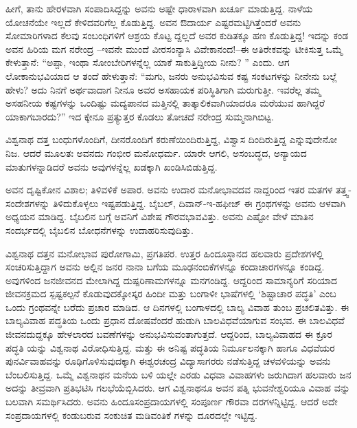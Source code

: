 ಹೀಗೆ, ತಾನು ಹೇರಳವಾಗಿ ಸಂಪಾದಿಸಿದ್ದನ್ನು ಅವನು ಅಷ್ಟೇ ಧಾರಾಳವಾಗಿ ಖರ್ಚೂ ಮಾಡುತ್ತಿದ್ದ. ನಾಳೆಯ ಯೋಚನೆಯೇ ಇಲ್ಲದೆ ಕೇಳಿದವರಿಗೆಲ್ಲ ಕೊಡುತ್ತಿದ್ದ. ಅವನ ಔದಾರ್ಯ ಎಷ್ಟರಮಟ್ಟಿಗಿತ್ತೆಂದರೆ ಅವನು ಸೋಮಾರಿಗಳಾದ ಕೆಲವು ಸಂಬಂಧಿಗಳಿಗೆ ಆಶ್ರಯ ಕೊಟ್ಟ ದ್ದಲ್ಲದೆ ಅವರ ಕುಡಿತಕ್ಕೂ ಹಣ ಕೊಡುತ್ತಿದ್ದ! ಇದನ್ನು ಕಂಡ ಅವನ ಹಿರಿಯ ಮಗ ನರೇಂದ್ರ –ಇವನೇ ಮುಂದೆ ವೀರಸಂನ್ಯಾಸಿ ವಿವೇಕಾನಂದ!–ಈ ಅತಿರೇಕವನ್ನು ಟೀಕಿಸುತ್ತ ಒಮ್ಮೆ ಕೇಳುತ್ತಾನೆ: “ಅಪ್ಪಾ, ಇಂಥಾ ಸೋಂಬೇರಿಗಳನ್ನೆಲ್ಲ ಯಾಕೆ ಸಾಕುತ್ತಿದ್ದೀಯ ನೀನು? ” ಎಂದು. ಆಗ ಲೋಕಾನುಭವಿಯಾದ ಆ ತಂದೆ ಹೇಳುತ್ತಾನೆ: “ಮಗು, ಜನರು ಅನುಭವಿಸುವ ಕಷ್ಟ ಸಂಕಟಗಳನ್ನು ನೀನೇನು ಬಲ್ಲೆ ಹೇಳು? ಅದು ನಿನಗೆ ಅರ್ಥವಾದಾಗ ನೀನೂ ಅವರ ಅಸಹಾಯಕ ಪರಿಸ್ಥಿತಿಗಾಗಿ ಮರುಗುತ್ತೀ. ಇವರೆಲ್ಲ ತಮ್ಮ ಅಸಹನೀಯ ಕಷ್ಟಗಳನ್ನು ಒಂದಿಷ್ಟು ಮದ್ಯಪಾನದ ಮತ್ತಿನಲ್ಲಿ ತಾತ್ಕಾಲಿಕವಾಗಿಯಾದರೂ ಮರೆಯುವ ಹಾಗಿದ್ದರೆ ಯಾಕಾಗಬಾರದು?” ಇದ ಕ್ಕೇನೂ ಪ್ರತ್ಯುತ್ತರ ಕೊಡಲು ತೋಚದೆ ನರೇಂದ್ರ ಸುಮ್ಮನಾಗಿಬಿಟ್ಟ.

ವಿಶ್ವನಾಥ ದತ್ತ ಬಂಧುಗಳೊಂದಿಗೆ, ದೀನರೊಂದಿಗೆ ಕರುಣೆಯಿಂದಿರುತ್ತಿದ್ದ, ವಿಶ್ವಾಸ ದಿಂದಿರುತ್ತಿದ್ದ ಎನ್ನುವುದೇನೋ ನಿಜ. ಆದರೆ ಮೂಲತಃ ಅವನದು ಗಂಭೀರ ಮನೋಧರ್ಮ. ಯಾರೇ ಆಗಲಿ, ಅಸಂಬದ್ಧದ, ಅನ್ಯಾಯದ ಮಾತುಗಳನ್ನಾಡಿದರೆ ಅವನು ಅವುಗಳನ್ನೆಲ್ಲ ಖಡಕ್ಕಾಗಿ ಖಂಡಿಸಿಬಿಡುತ್ತಿದ್ದ.

ಅವನ ದೃಷ್ಟಿಕೋನ ವಿಶಾಲ; ತಿಳಿವಳಿಕೆ ಅಪಾರ. ಅವನು ಉದಾರ ಮನೋಭಾವದವ ನಾದ್ದರಿಂದ ಇತರ ಮತಗಳ ತತ್ತ್ವ-ಸಂದೇಶಗಳನ್ನು ತಿಳಿದುಕೊಳ್ಳಲು ಇಷ್ಟಪಡುತ್ತಿದ್ದ. ಬೈಬಲ್, ದಿವಾನ್​-ಇ-ಹಫೀಜ್ ಈ ಗ್ರಂಥಗಳನ್ನು ಅವನು ಆಳವಾಗಿ ಅಧ್ಯಯನ ಮಾಡಿದ್ದ. ಬೈಬಲಿನ ಬಗ್ಗೆ ಅವನಿಗೆ ವಿಶೇಷ ಗೌರವಭಾವವಿತ್ತು. ಅವನು ಎಷ್ಟೋ ವೇಳೆ ಮಾತಿನ ಸಂದರ್ಭದಲ್ಲಿ ಬೈಬಲಿನ ಬೋಧನೆಗಳನ್ನು ಉದಾಹರಿಸುವುದಿತ್ತು.

ವಿಶ್ವನಾಥ ದತ್ತನ ಮನೋಭಾವ ಪುರೋಗಾಮಿ, ಪ್ರಗತಿಪರ. ಉತ್ತರ ಹಿಂದೂಸ್ಥಾನದ ಹಲವಾರು ಪ್ರದೇಶಗಳಲ್ಲಿ ಸಂಚರಿಸುತ್ತಿದ್ದಾಗ ಅವನು ಅಲ್ಲಿನ ಜನರ ನಾನಾ ಬಗೆಯ ಮೂಢನಂಬಿಕೆಗಳನ್ನೂ ಕಂದಾಚಾರಗಳನ್ನೂ ಕಂಡಿದ್ದ. ಅವುಗಳಿಂದ ಜನಜೀವನದ ಮೇಲಾಗಿದ್ದ ದುಷ್ಪರಿಣಾಮಗಳನ್ನೂ ಮನಗಂಡಿದ್ದ. ಆದ್ದರಿಂದ ಸಾಮಾನ್ಯರಿಗೆ ಸರಿಯಾದ ಜೀವನಕ್ರಮದ ಸ್ಪಷ್ಟಕಲ್ಪನೆ ಕೊಡುವುದಕ್ಕೋಸ್ಕರ ಹಿಂದೀ ಮತ್ತು ಬಂಗಾಳೀ ಭಾಷೆಗಳಲ್ಲಿ ‘ಶಿಷ್ಟಾಚಾರ ಪದ್ಧತಿ’ ಎಂಬ ಒಂದು ಗ್ರಂಥವನ್ನೇ ಬರೆದು ಪ್ರಚಾರ ಮಾಡಿದ. ಆ ದಿನಗಳಲ್ಲಿ ಬಂಗಾಳದಲ್ಲಿ ಬಾಲ್ಯ ವಿವಾಹ ತುಂಬ ಪ್ರಚಲಿತವಿತ್ತು. ಈ ಬಾಲ್ಯವಿವಾಹ ಪದ್ಧತಿಯ ಒಂದು ಪ್ರಧಾನ ದೋಷವೆಂದರೆ ಹುಡುಗಿ ಬಾಲವಿಧವೆಯಾಗುವ ಸಂಭವ. ಈ ಬಾಲವಿಧವೆ ಜೀವನದುದ್ದಕ್ಕೂ ಹೇಳಲಾರದ ಬವಣೆಗಳನ್ನು ಅನುಭವಿಸುವಂತಾಗುತ್ತದೆ. ಆದ್ದರಿಂದ, ಬಾಲ್ಯವಿವಾಹದ ಈ ಕ್ರೂರ ಪದ್ಧತಿ ಯನ್ನು ವಿಶ್ವನಾಥ ವಿರೋಧಿಸುತ್ತಿದ್ದ. ಮತ್ತು ಈ ಅನಿಷ್ಟ ಪದ್ಧತಿಯ ನಿರ್ಮೂಲನಕ್ಕಾಗಿ ಹಾಗೂ ವಿಧವೆಯರ ಪುನರ್ವಿವಾಹವನ್ನು ರೂಢಿಗೊಳಿಸುವುದಕ್ಕಾಗಿ ಈಶ್ವರಚಂದ್ರ ವಿದ್ಯಾಸಾಗರರು ನಡೆಸುತ್ತಿದ್ದ ಚಳವಳಿಯನ್ನು ಅವನು ಬೆಂಬಲಿಸುತ್ತಿದ್ದ. ಒಮ್ಮೆ ವಿಶ್ವನಾಥನ ಮನೆಯ ಬಳಿ ಯಲ್ಲೇ ಎರಡು ವಿಧವಾ ವಿವಾಹಗಳು ಜರುಗಿದಾಗ ಹಲವಾರು ಜನ ಅದನ್ನು ತೀವ್ರವಾಗಿ ಪ್ರತಿಭಟಿಸಿ ಗಲಭೆಯೆಬ್ಬಿಸಿದರು. ಆಗ ವಿಶ್ವನಾಥನೂ ಅವನ ಪತ್ನಿ ಭುವನೇಶ್ವರಿಯೂ ವಿವಾಹ ವನ್ನು ಬಲವಾಗಿ ಸಮರ್ಥಿಸಿದರು. ಅವನು ಹಿಂದೂಸಂಪ್ರದಾಯಗಳಲ್ಲಿ ಸಂಪೂರ್ಣ ಗೌರವಾ ದರಗಳನ್ನಿಟ್ಟಿದ್ದ. ಆದರೆ ಅದೇ ಸಂಪ್ರದಾಯಗಳಲ್ಲಿ ಕಂಡುಬರುವ ಸಂಕುಚಿತ ಮಡಿವಂತಿಕೆ ಗಳನ್ನು ದೂರದಲ್ಲೇ ಇಟ್ಟಿದ್ದ.

